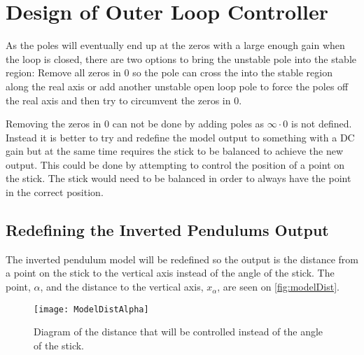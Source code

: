 \section{Design of Outer Loop Controller}
As the poles will eventually end up at the zeros with a large enough gain when the loop is closed, there are two options to bring the unstable pole into the stable region: Remove all zeros in 0 so the pole can cross the into the stable region along the real axis or add another unstable open loop pole to force the poles off the real axis and then try to circumvent the zeros in 0. 

Removing the zeros in 0 can not be done by adding poles as $\infty \cdot 0$ is not defined. Instead it is better to try and redefine the model output to something with a DC gain but at the same time requires the stick to be balanced to achieve the new output. This could be done by attempting to control the position of a point on the stick. The stick would need to be balanced in order to always have the point in the correct position.


\subsection{Redefining the Inverted Pendulums Output} \label{subsec:InvPendOuterLoopRedef}
The inverted pendulum model will be redefined so the output is the distance from a point on the stick to the vertical axis instead of the angle of the stick. The point, $\alpha$, and the distance to the vertical axis, $x_\alpha$, are seen on \autoref{fig:modelDist}.

\begin{figure}[htbp]
\centering
\texttt{[image: ModelDistAlpha]}
\caption{Diagram of the distance that will be controlled instead of the angle of the stick.}
\label{fig:modelDist}
\end{figure}

